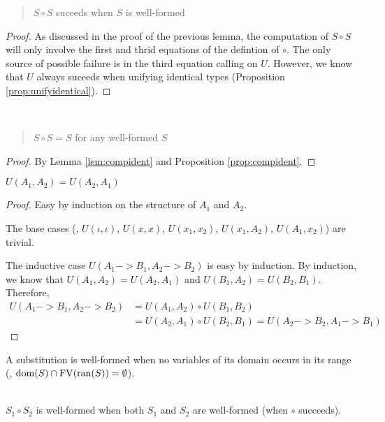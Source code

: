 \begin{proposition}
	\label{prop:compident}
\begin{quote} $S \circ S$ suceeds when $S$ is well-formed \end{quote}
\end{proposition}
\begin{proof}
As discussed in the proof of the previous lemma,
the computation of $S \circ S$ will only involve
the first and thrid equations of the defintion of $\circ$.
The only source of possible failure is in the third equation calling on $U$.
However, we know that $U$ always suceeds when unifying identical types
(Proposition \ref{prop:unifyidentical}).
\end{proof}

\begin{theorem} ~
	\begin{quote} $S\circ S = S$ for any well-formed $S$ \end{quote}
\end{theorem}
\begin{proof}
	By Lemma \ref{lem:compident} and Proposition \ref{prop:compident}.
\end{proof}

\begin{theorem} $ U(A_1,A_2) = U(A_2,A_1) $
	\label{thm:commU}
\end{theorem}
\begin{proof} Easy by induction on the structure of $A_1$ and $A_2$.

The base cases (\ie, $U(\iota,\iota)$, $U(x,x)$, $U(x_1,x_2)$,
			$U(x_1,A_2)$, $U(A_1,x_2)$) are trivial.

The inductive case $U(A_1 -> B_1, A_2 -> B_2)$ is easy by induction.
By induction, we know that $U(A_1,A_2) = U(A_2,A_1)$ and
$U(B_1,A_2) = U(B_2,B_1)$. Therefore,
\begin{align*}
U(A_1 -> B_1, A_2 -> B_2)
	&= U(A_1,A_2) \circ U(B_1,B_2) \\
	&= U(A_2,A_1) \circ U(B_2,B_1) = U(A_2 -> B_2, A_1 -> B_1)
\end{align*}
\end{proof}


A substitution is well-formed when no variables of its domain
occurs in its range (\ie, $\mathop{\mathrm{dom}}(S)\cap\mathop{\mathrm{FV}}(\mathop{\mathrm{ran}}(S))=\emptyset$).

\begin{proposition}~\\
	\indent
$S_1\circ S_2$ is well-formed when both $S_1$ and $S_2$ are well-formed
(when $\circ$ succeeds).
\end{proposition}

